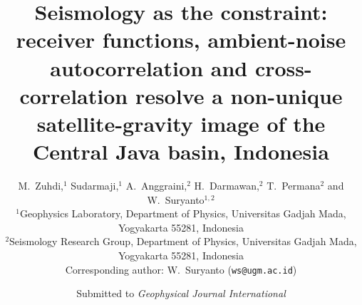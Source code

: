 %
\documentclass[11pt,a4paper]{article}
\usepackage[T1]{fontenc}
\usepackage{times}
\usepackage{amsmath,amssymb}
\usepackage{graphicx}
\usepackage[hmargin=2.3cm,vmargin=2.6cm]{geometry}
\usepackage[round,authoryear]{natbib}
\usepackage{setspace}
\usepackage{caption}
\usepackage{siunitx}
\usepackage[hidelinks]{hyperref}
\captionsetup{font=small,labelfont=bf}
\graphicspath{{fig_cj/}}
\onehalfspacing
\renewcommand{\abstractname}{Summary}

\title{\vspace{-1.2cm}\bfseries Seismology as the constraint: receiver functions,
ambient-noise autocorrelation and cross-correlation resolve a non-unique
satellite-gravity image of the Central Java basin, Indonesia}

\author{%
M.~Zuhdi,$^{1}$ Sudarmaji,$^{1}$ A.~Anggraini,$^{2}$ H.~Darmawan,$^{2}$
T.~Permana$^{2}$ and W.~Suryanto$^{1,2}$\\[2pt]
\small $^{1}$Geophysics Laboratory, Department of Physics, Universitas Gadjah Mada,
Yogyakarta 55281, Indonesia\\
\small $^{2}$Seismology Research Group, Department of Physics, Universitas Gadjah
Mada, Yogyakarta 55281, Indonesia\\[2pt]
\small Corresponding author: W.~Suryanto (\texttt{ws@ugm.ac.id})}
\date{Submitted to \emph{Geophysical Journal International}}


